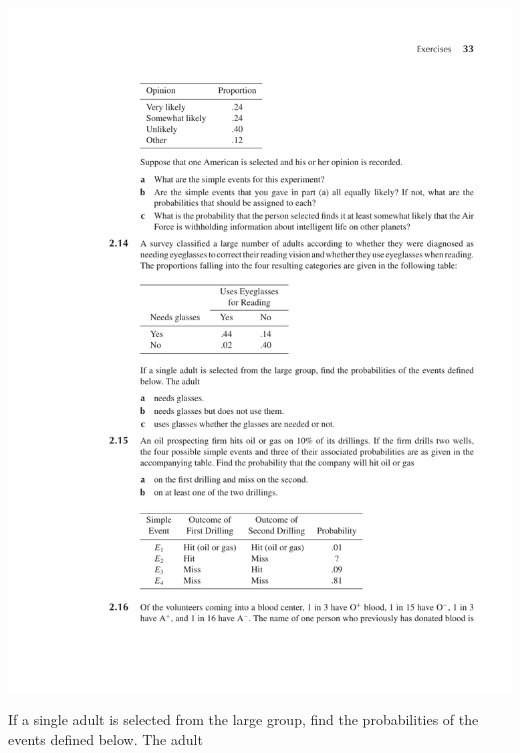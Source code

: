 \documentclass[12pt,reqno]{amsart}
\begin{document}
\medskip
\begin{center}
\includegraphics[scale=1]{img.pdf}
\end{center}
\medskip

If a single adult is selected from the large group, find the probabilities of the events defined below. The adult
\end{document}
